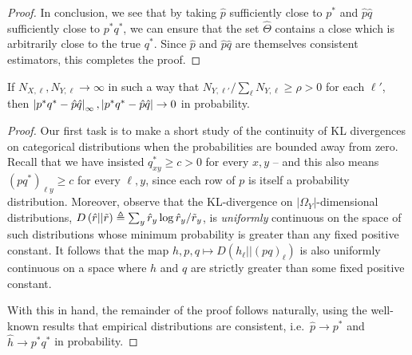 \begin{proof}
In conclusion, we see that by taking $\hat p$ sufficiently close to $p^*$ and $\hat p \hat q$ sufficiently close to $p^*q^*$, we can ensure that the set $\hat \Theta$ contains a close which is arbitrarily close to the true $q^*$.  Since $\hat p$ and $\hat p \hat q$ are themselves consistent estimators, this completes the proof.
\end{proof}

\begin{lem}
\label{lem:easyconsistency} If $N_{X,\ell},N_{Y,\ell}\rightarrow \infty$ in such a way that $N_{Y,\ell'}/\sum_{\ell}N_{Y,\ell} \geq \rho>0$ for each $\ell'$, then $\left|p^*q^*-\hat p\hat q\right|_\infty,\left|p^*q^*-\hat p\hat q\right|\rightarrow 0$ in probability.
\end{lem}
\begin{proof}
Our first task is to make a short study of the continuity of KL divergences on categorical distributions when the probabilities are bounded away from zero.  Recall that we have insisted $q^*_{xy}\geq c>0$ for every $x,y$ -- and this also means $(pq^*)_{\ell y}\geq c$ for every $\ell,y$, since each row of $p$ is itself a probability distribution.  Moreover, observe that the KL-divergence on $|\Omega_Y|$-dimensional distributions, $D\left(\hat r||\tilde r\right) \triangleq \sum_{y} \hat r_y \log \hat r_y / \tilde r_y$, is \emph{uniformly} continuous on the space of such distributions whose minimum probability is greater than any fixed positive constant.   It follows that the map $h,p,q \mapsto D(h_\ell||(pq)_\ell)$ is also uniformly continuous on a space where $h$ and $q$ are strictly greater than some fixed positive constant.   

With this in hand, the remainder of the proof follows naturally, using the well-known results that empirical distributions are consistent, i.e.\ $\hat p \rightarrow p^*$ and $\hat h \rightarrow p^*q^*$ in probability.


\end{proof}
